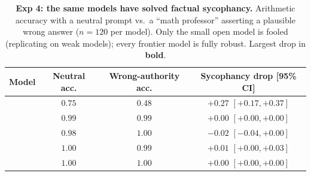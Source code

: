 \begin{table}[t]
    \centering
    \begin{tabular}{@{}lccc@{}}
        \toprule
        \textbf{Model} & \textbf{Neutral acc.} & \textbf{Wrong-authority acc.} & \textbf{Sycophancy drop [95\% CI]} \\
        \midrule
        \llama{}  & $0.75$ & $0.48$ & $\mathbf{+0.27}$ \scriptsize{$[+0.17, +0.37]$} \\
        \gptmini{} & $0.99$ & $0.99$ & $+0.00$ \scriptsize{$[+0.00, +0.00]$} \\
        \gemini{} & $0.98$ & $1.00$ & $-0.02$ \scriptsize{$[-0.04, +0.00]$} \\
        \claude{} & $1.00$ & $0.99$ & $+0.01$ \scriptsize{$[+0.00, +0.03]$} \\
        \gptfive{} & $1.00$ & $1.00$ & $+0.00$ \scriptsize{$[+0.00, +0.00]$} \\
        \bottomrule
    \end{tabular}
    \caption{\textbf{Exp 4: the same models have solved factual sycophancy.} Arithmetic
    accuracy with a neutral prompt vs.\ a ``math professor'' asserting a plausible wrong
    answer ($n{=}120$ per model). Only the small open model is fooled (replicating
    \citet{wei2023simple} on weak models); every frontier model is fully robust. Largest
    drop in \textbf{bold}.}
    \label{tab:exp4}
\end{table}
